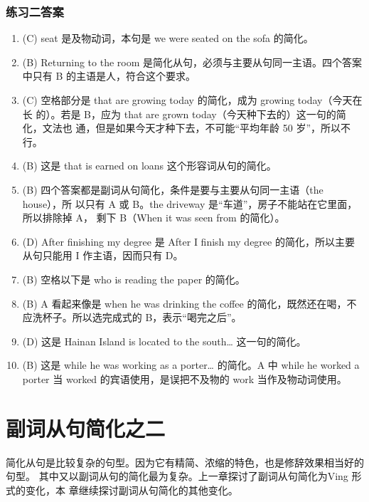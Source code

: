 \subsection{练习二答案}
\begin{enumerate}
\item(C) seat 是及物动词，本句是 we were seated on the sofa 的简化。

\item (B) Returning to the room 是简化从句，必须与主要从句同一主语。四个答案中只有 B 的主语是人，符合这个要求。

\item (C) 空格部分是 that are growing today 的简化，成为 growing today（今天在长
  的）。若是 B，应为 that are grown today（今天种下去的）这一句的简化，文法也
  通，但是如果今天才种下去，不可能“平均年龄 50 岁”，所以不行。

\item (B) 这是 that is earned on loans 这个形容词从句的简化。

\item (B) 四个答案都是副词从句简化，条件是要与主要从句同一主语（the house），所
  以只有 A 或 B。the driveway 是“车道”，房子不能站在它里面，所以排除掉 A，
  剩下 B（When it was seen from 的简化）。

\item (D) After finishing my degree 是 After I finish my degree 的简化，所以主要
  从句只能用 I 作主语，因而只有 D。

\item (B) 空格以下是 who is reading the paper 的简化。

\item  (B) A 看起来像是 when he was drinking the coffee 的简化，既然还在喝，不应洗杯子。所以选完成式的 B，表示“喝完之后”。

\item (D) 这是 Hainan Island is located to the south… 这一句的简化。

\item (B) 这是 while he was working as a porter… 的简化。A 中 while he worked
  a porter 当 worked 的宾语使用，是误把不及物的 work 当作及物动词使用。
\end{enumerate}

\chapter{副词从句简化之二}

简化从句是比较复杂的句型。因为它有精简、浓缩的特色，也是修辞效果相当好的句型。
其中又以副词从句的简化最为复杂。上一章探讨了副词从句简化为Ving 形式的变化，本
章继续探讨副词从句简化的其他变化。

